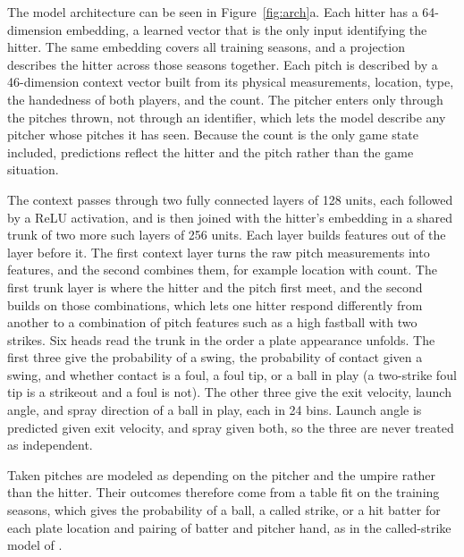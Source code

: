 \documentclass[11pt,letterpaper]{article}
\begin{document}
The model architecture can be seen in Figure~\ref{fig:arch}a. Each hitter has a 64-dimension embedding, a learned vector that is the only input identifying the hitter. The same embedding covers all training seasons, and a projection describes the hitter across those seasons together. Each pitch is described by a 46-dimension context vector built from its physical measurements, location, type, the handedness of both players, and the count. The pitcher enters only through the pitches thrown, not through an identifier, which lets the model describe any pitcher whose pitches it has seen. Because the count is the only game state included, predictions reflect the hitter and the pitch rather than the game situation.

The context passes through two fully connected layers of 128 units, each followed by a ReLU activation, and is then joined with the hitter's embedding in a shared trunk of two more such layers of 256 units. Each layer builds features out of the layer before it. The first context layer turns the raw pitch measurements into features, and the second combines them, for example location with count. The first trunk layer is where the hitter and the pitch first meet, and the second builds on those combinations, which lets one hitter respond differently from another to a combination of pitch features such as a high fastball with two strikes. Six heads read the trunk in the order a plate appearance unfolds. The first three give the probability of a swing, the probability of contact given a swing, and whether contact is a foul, a foul tip, or a ball in play (a two-strike foul tip is a strikeout and a foul is not). The other three give the exit velocity, launch angle, and spray direction of a ball in play, each in 24 bins. Launch angle is predicted given exit velocity, and spray given both, so the three are never treated as independent.

Taken pitches are modeled as depending on the pitcher and the umpire rather than the hitter. Their outcomes therefore come from a table fit on the training seasons, which gives the probability of a ball, a called strike, or a hit batter for each plate location and pairing of batter and pitcher hand, as in the called-strike model of \citet{deshpande2017}.
\end{document}
